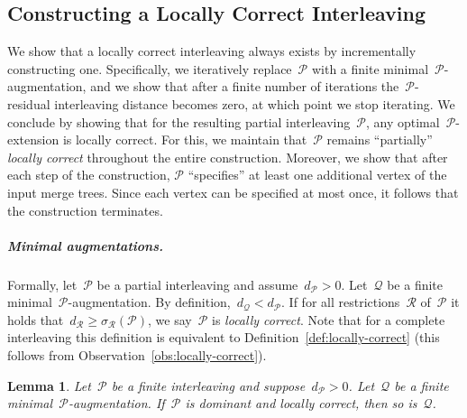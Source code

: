 \documentclass[11pt]{article}
\newtheorem{lemma}[theorem]{Lemma}
\newcommand{\shift}[1]{\sigma_{#1}}
\newcommand{\resdist}[1]{d_{#1}}
\renewcommand{\P}{\mathcal{P}}
\newcommand{\Q}{\mathcal{Q}}
\newcommand{\R}{\mathcal{R}}
\begin{document}
\subsection{Constructing a Locally Correct Interleaving}\label{sec:locally-correct-partial-merge-tree-matchings}
We show that a locally correct interleaving always exists by incrementally constructing one.
Specifically, we iteratively replace~$\P$ with a finite minimal~$\P$-augmentation, and we show that after a finite number of iterations the~$\P$-residual interleaving distance becomes zero, at which point we stop iterating.
We conclude by showing that for the resulting partial interleaving~$\P$, any optimal~$\P$-extension is locally correct.
For this, we maintain that~$\P$ remains ``partially'' \emph{locally correct} throughout the entire construction.
Moreover, we show that after each step of the construction, $\P$ ``specifies'' at least one additional vertex of the input merge trees.
Since each vertex can be specified at most once, it follows that the construction terminates.
%
\subparagraph{Minimal augmentations.}
Formally, let~$\mathcal{P}$ be a partial interleaving and assume~$\resdist{\P} > 0$.
Let~$\Q$ be a finite minimal~$\P$-augmentation.
By definition,~$\resdist{\Q} < \resdist{\P}$.
If for all restrictions~$\R$ of~$\P$ it holds that~$\resdist{\R} \ge \shift{\R}(\P)$, we say~$\P$ is \emph{locally correct}.
Note that for a complete interleaving this definition is equivalent to Definition~\ref{def:locally-correct} (this follows from Observation~\ref{obs:locally-correct}).
\begin{lemma}\label{lem:dominant-locally-correct}
Let~$\P$ be a finite interleaving and suppose~$\resdist{\P} > 0$.
Let~$\Q$ be a finite minimal~$\P$-augmentation.
If~$\P$ is dominant and locally correct, then so is~$\Q$.
\end{lemma}
\end{document}
